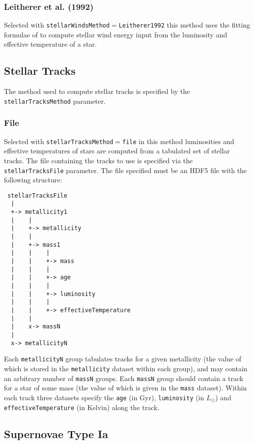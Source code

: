 \subsubsection{Leitherer et al. (1992)}

Selected with {\tt stellarWindsMethod}$=${\tt Leitherer1992} this method uses the fitting formulae of \cite{leitherer_deposition_1992} to compute stellar wind energy input from the luminosity and effective temperature of a star.

\subsection{Stellar Tracks}

The method used to compute stellar tracks is specified by the {\tt stellarTracksMethod} parameter.

\subsubsection{File}\label{sec:StellarTracksFile}

Selected with {\tt stellarTracksMethod}$=${\tt file} in this method luminosities and effective temperatures of stars are computed from a tabulated set of stellar tracks. The file containing the tracks to use is specified via the {\tt stellarTracksFile} parameter. The file specified must be an HDF5 file with the following structure:
\begin{verbatim}
 stellarTracksFile
  |
  +-> metallicity1
  |    |
  |    +-> metallicity
  |    |
  |    +-> mass1
  |    |    |
  |    |    +-> mass
  |    |    |
  |    |    +-> age
  |    |    |
  |    |    +-> luminosity
  |    |    |
  |    |    +-> effectiveTemperature
  |    |
  |    x-> massN
  |
  x-> metallicityN
\end{verbatim}
Each {\tt metallicityN} group tabulates tracks for a given metallicity (the value of which is stored in the {\tt metallicity} dataset within each group), and may contain an arbitrary number of {\tt massN} groups. Each {\tt massN} group should contain a track for a star of some mass (the value of which is given in the {\tt mass} dataset). Within each track three datasets specify the {\tt age} (in Gyr), {\tt luminosity} (in $L_\odot$) and {\tt effectiveTemperature} (in Kelvin) along the track.

\subsection{Supernovae Type Ia}

